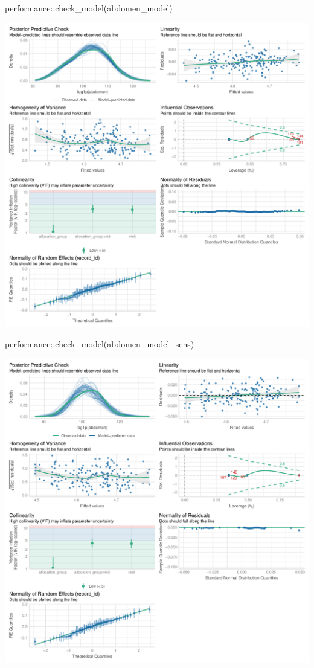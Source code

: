 \documentclass[
  12pt,
]{article}
\newenvironment{Shaded}{\begin{snugshade}}{\end{snugshade}}
\newcommand{\FunctionTok}[1]{\textcolor[rgb]{0.28,0.35,0.67}{#1}}
\newcommand{\NormalTok}[1]{\textcolor[rgb]{0.00,0.23,0.31}{#1}}
\newcommand{\SpecialCharTok}[1]{\textcolor[rgb]{0.37,0.37,0.37}{#1}}
\begin{document}
\begin{Shaded}
\begin{Highlighting}[]
\NormalTok{performance}\SpecialCharTok{::}\FunctionTok{check\_model}\NormalTok{(abdomen\_model)}
\end{Highlighting}
\end{Shaded}

\includegraphics{Outcomes_files/figure-pdf/abdomen_4-1.pdf}

\begin{Shaded}
\begin{Highlighting}[]
\NormalTok{performance}\SpecialCharTok{::}\FunctionTok{check\_model}\NormalTok{(abdomen\_model\_sens)}
\end{Highlighting}
\end{Shaded}

\includegraphics{Outcomes_files/figure-pdf/abdomen_4-2.pdf}
\end{document}
